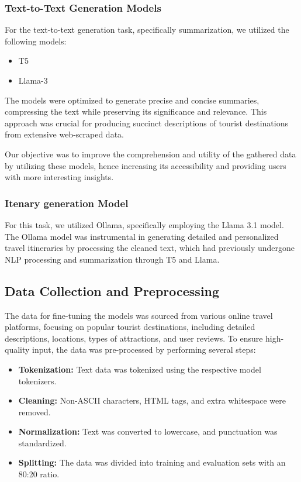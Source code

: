 \documentclass[conference]{IEEEtran}
\begin{document}
        \subsubsection{Text-to-Text Generation Models}
            For the text-to-text generation task, specifically summarization, we utilized the following models:
            \begin{itemize}
                \item T5
                \item Llama-3
            \end{itemize}

            The models were optimized to generate precise and concise summaries, compressing the text while preserving its significance and relevance. This approach was crucial for producing succinct descriptions of tourist destinations from extensive web-scraped data.

            Our objective was to improve the comprehension and utility of the gathered data by utilizing these models, hence increasing its accessibility and providing users with more interesting insights.
        {\\}
         \subsubsection{Itenary generation Model}
            For this task, we utilized Ollama, specifically employing the Llama 3.1 model. The Ollama model was instrumental in generating detailed and personalized travel itineraries by processing the cleaned text, which had previously undergone NLP processing and summarization through T5 and Llama.
{\\}
    \subsection{Data Collection and Preprocessing}

        The data for fine-tuning the models was sourced from various online travel platforms, focusing on popular tourist destinations, including detailed descriptions, locations, types of attractions, and user reviews. To ensure high-quality input, the data was pre-processed by performing several steps:

        \begin{itemize}
            \item \textbf{Tokenization:} Text data was tokenized using the respective model tokenizers.
            \item \textbf{Cleaning:} Non-ASCII characters, HTML tags, and extra whitespace were removed.
            \item \textbf{Normalization:} Text was converted to lowercase, and punctuation was standardized.
            \item \textbf{Splitting:} The data was divided into training and evaluation sets with an 80:20 ratio.
        \end{itemize}
\end{document}
